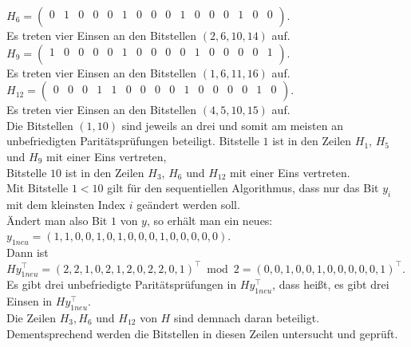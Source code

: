 \begin{Beispiel}
    $H_6= \left( \begin{array}{rrrrrrrrrrrrrrrr}
        0 & 1 & 0 & 0 & 0 & 1 & 0 & 0 & 0 & 1 & 0 & 0 & 0 & 1 & 0 & 0 \\
       \end{array}\right). 
    $\\
    Es treten vier Einsen an den Bitstellen $(2, 6, 10, 14)$ auf.\\
    
    $H_9= \left( \begin{array}{rrrrrrrrrrrrrrrr}
        1 & 0 & 0 & 0 & 0 & 1 & 0 & 0 & 0 & 0 & 1 & 0 & 0 & 0 & 0 & 1 \\
       \end{array}\right). 
    $\\
    Es treten vier Einsen an den Bitstellen $(1, 6, 11, 16)$ auf.\\
    
    $H_{12}= \left( \begin{array}{rrrrrrrrrrrrrrrr}
        0 & 0 & 0 & 1 & 1 & 0 & 0 & 0 & 0 & 1 & 0 & 0 & 0 & 0 & 1 & 0 \\
       \end{array}\right). 
    $\\
    Es treten vier Einsen an den Bitstellen $(4, 5, 10, 15)$ auf.\\
    
    
    
    Die Bitstellen $(1, 10)$ sind jeweils an drei und somit am meisten an unbefriedigten Paritätsprüfungen beteiligt.
    Bitstelle $1$ ist in den Zeilen $H_1$, $H_5$ und $H_9$ mit einer Eins vertreten,\\
    Bitstelle $10$ ist in den Zeilen $H_3$, $H_6$ und $H_{12}$ mit einer Eins vertreten.\\
    Mit Bitstelle $1 < 10$ gilt für den sequentiellen Algorithmus, dass nur das Bit $y_i$ mit dem kleinsten Index $i$ geändert werden soll.\\
    
    Ändert man also Bit $1$ von $y$, so erhält man ein neues:\\
    $y_{1neu} = (1,1,0,0,1,0,1,0,0,0,1,0,0,0,0,0)$.\\
    
    Dann ist $Hy_{1neu}^\intercal = (2,2,1,0,2,1,2,0,2,2,0,1)^\intercal \bmod 2 = (0,0,1,0,0,1,0,0,0,0,0,1)^\intercal$.\\
    
    Es gibt drei unbefriedigte Paritätsprüfungen in $Hy_{1neu}^\intercal$,
    dass hei\ss{}t, es gibt drei Einsen in $Hy_{1neu}^\intercal.$\\
    Die Zeilen $H_3, H_6$ und $H_{12}$ von $H$ sind demnach daran beteiligt.\\
    Dementsprechend werden die Bitstellen in diesen Zeilen untersucht und geprüft.\\
    

\end{Beispiel}
